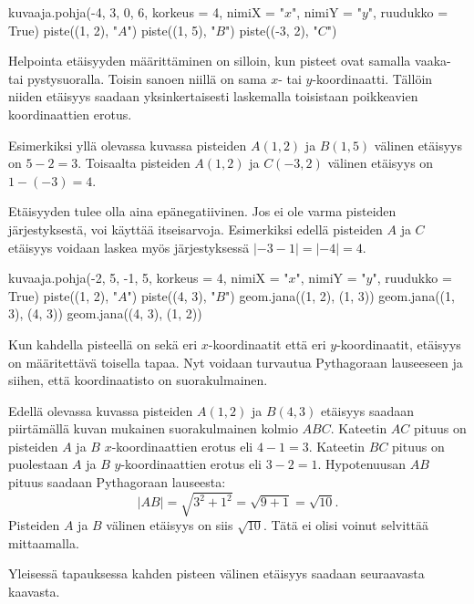 \begin{kuva}
    kuvaaja.pohja(-4, 3, 0, 6, korkeus = 4, nimiX = "$x$", nimiY = "$y$", ruudukko = True)
    piste((1, 2), "$A$")
    piste((1, 5), "$B$")
    piste((-3, 2), "$C$")
\end{kuva}

Helpointa etäisyyden määrittäminen on silloin, kun pisteet ovat samalla vaaka- tai pystysuoralla.
Toisin sanoen niillä on sama $x$- tai $y$-koordinaatti.
Tällöin niiden etäisyys saadaan yksinkertaisesti laskemalla toisistaan poikkeavien koordinaattien erotus.

Esimerkiksi yllä olevassa kuvassa pisteiden $A(1, 2)$ ja $B(1, 5)$ välinen etäisyys on $5-2=3$.
Toisaalta pisteiden $A(1, 2)$ ja $C(-3, 2)$ välinen etäisyys on $1-(-3)=4$.

Etäisyyden tulee olla aina epänegatiivinen.
Jos ei ole varma pisteiden järjestyksestä, voi käyttää itseisarvoja.
Esimerkiksi edellä pisteiden $A$ ja $C$ etäisyys voidaan laskea myös järjestyksessä $|-3-1|=|-4|=4$.


\begin{kuva}
    kuvaaja.pohja(-2, 5, -1, 5, korkeus = 4, nimiX = "$x$", nimiY = "$y$", ruudukko = True)
    piste((1, 2), "$A$")
    piste((4, 3), "$B$")
    geom.jana((1, 2), (1, 3))
    geom.jana((1, 3), (4, 3))
    geom.jana((4, 3), (1, 2))
\end{kuva}

Kun kahdella pisteellä on sekä eri $x$-koordinaatit että eri $y$-koordinaatit, etäisyys on määritettävä toisella tapaa.
Nyt voidaan turvautua Pythagoraan lauseeseen ja siihen, että koordinaatisto on suorakulmainen.

Edellä olevassa kuvassa pisteiden $A(1, 2)$ ja $B(4, 3)$ etäisyys saadaan piirtämällä kuvan mukainen suorakulmainen kolmio $ABC$.
Kateetin $AC$ pituus on pisteiden $A$ ja $B$ $x$-koordinaattien erotus eli $4-1=3$.
Kateetin $BC$ pituus on puolestaan $A$ ja $B$ $y$-koordinaattien erotus eli $3-2=1$.
Hypotenuusan $AB$ pituus saadaan Pythagoraan lauseesta:
\[
|AB|=\sqrt{3^2+1^2}=\sqrt{9+1}=\sqrt{10}.
\]
Pisteiden $A$ ja $B$ välinen etäisyys on siis $\sqrt{10}$.
Tätä ei olisi voinut selvittää mittaamalla.

Yleisessä tapauksessa kahden pisteen välinen etäisyys saadaan seuraavasta kaavasta.

